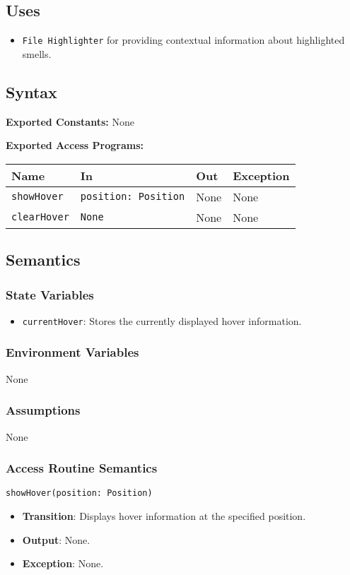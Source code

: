 \documentclass[12pt, titlepage]{article}
\begin{document}
\subsection{Uses}
\begin{itemize}
\item \texttt{File Highlighter} for providing contextual information about highlighted smells.
\end{itemize}

\subsection{Syntax}

\textbf{Exported Constants:} None

\textbf{Exported Access Programs:}\\
\begin{tabularx}{\linewidth}{|l|>{\raggedright\arraybackslash}X|l|l|}
  \hline
  \textbf{Name} & \textbf{In} & \textbf{Out} & \textbf{Exception} \\
  \hline
  \texttt{showHover} & \texttt{position: Position} & None & None \\ \hline
  \texttt{clearHover} & \texttt{None} & None & None \\
  \hline
\end{tabularx}

\subsection{Semantics}

\subsubsection{State Variables}
\begin{itemize}
\item \texttt{currentHover}: Stores the currently displayed hover information.
\end{itemize}

\subsubsection{Environment Variables}
None


\subsubsection{Assumptions}
None

\subsubsection{Access Routine Semantics}
\texttt{showHover(position: Position)}
\begin{itemize}
\item \textbf{Transition}: Displays hover information at the specified position.
\item \textbf{Output}: None.
\item \textbf{Exception}: None.
\end{itemize}
\end{document}
